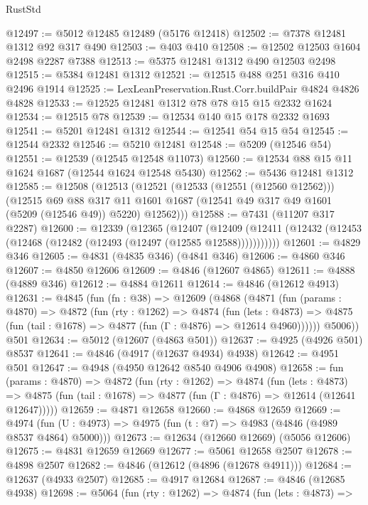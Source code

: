 \begin{lexlean}{RustStd}
\begin{coremodule}
@12497 := @5012 @12485 @12489 (@5176 @12418)
@12502 := @7378 @12481 @1312 @92 @317 @490
@12503 := @403 @410
@12508 := @12502 @12503 @1604 @2498 @2287 @7388
@12513 := @5375 @12481 @1312 @490 @12503 @2498
@12515 := @5384 @12481 @1312
@12521 := @12515 @488 @251 @316 @410 @2496 @1914
@12525 := LexLeanPreservation.Rust.Corr.buildPair @4824 @4826 @4828
@12533 := @12525 @12481 @1312 @78 @78 @15 @15 @2332 @1624
@12534 := @12515 @78
@12539 := @12534 @140 @15 @178 @2332 @1693
@12541 := @5201 @12481 @1312
@12544 := @12541 @54 @15 @54
@12545 := @12544 @2332
@12546 := @5210 @12481
@12548 := @5209 (@12546 @54)
@12551 := @12539 (@12545 @12548 @11073)
@12560 := @12534 @88 @15 @11 @1624 @1687 (@12544 @1624 @12548 @5430)
@12562 := @5436 @12481 @1312
@12585 := @12508
    (@12513
      (@12521
        (@12533 (@12551 (@12560 @12562)))
        (@12515
          @69
          @88
          @317
          @11
          @1601
          @1687
          (@12541 @49 @317 @49 @1601 (@5209 (@12546 @49)) @5220)
          @12562)))
@12588 := @7431 (@11207 @317 @2287)
@12600 := @12339
    (@12365
      (@12407
        (@12409 (@12411 (@12432 (@12453 (@12468 (@12482 (@12493 (@12497 (@12585 @12588)))))))))))
@12601 := @4829 @346
@12605 := @4831 (@4835 @346) (@4841 @346)
@12606 := @4860 @346
@12607 := @4850 @12606
@12609 := @4846 (@12607 @4865)
@12611 := @4888 (@4889 @346)
@12612 := @4884 @12611
@12614 := @4846 (@12612 @4913)
@12631 := @4845
    (fun (fn : @38) =>
    @12609
      (@4868
        (@4871
          (fun (params : @4870) =>
          @4872
            (fun (rty : @1262) =>
            @4874
              (fun (lets : @4873) =>
              @4875 (fun (tail : @1678) => @4877 (fun (Γ : @4876) => @12614 @4960))))))
        @5006))
    @501
@12634 := @5012 (@12607 (@4863 @501))
@12637 := @4925 (@4926 @501) @8537
@12641 := @4846 (@4917 (@12637 @4934) @4938)
@12642 := @4951 @501
@12647 := @4948 (@4950 @12642 @8540 @4906 @4908)
@12658 := fun (params : @4870) =>
  @4872
    (fun (rty : @1262) =>
    @4874
      (fun (lets : @4873) =>
      @4875 (fun (tail : @1678) => @4877 (fun (Γ : @4876) => @12614 (@12641 @12647)))))
@12659 := @4871 @12658
@12660 := @4868 @12659
@12669 := @4974 (fun (U : @4973) => @4975 (fun (t : @7) => @4983 (@4846 (@4989 @8537 @4864) @5000)))
@12673 := @12634 (@12660 @12669) (@5056 @12606)
@12675 := @4831 @12659 @12669
@12677 := @5061 @12658 @2507
@12678 := @4898 @2507
@12682 := @4846 (@12612 (@4896 (@12678 @4911)))
@12684 := @12637 (@4933 @2507)
@12685 := @4917 @12684
@12687 := @4846 (@12685 @4938)
@12698 := @5064
    (fun (rty : @1262) =>
    @4874
      (fun (lets : @4873) =>

\end{coremodule}
\end{lexlean}

